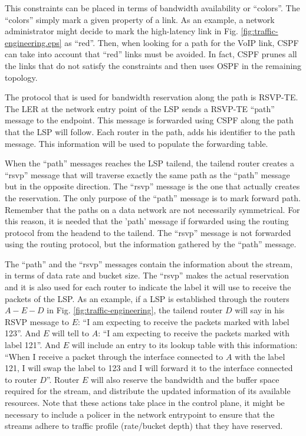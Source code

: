 This constraints can be placed in terms of bandwidth availability or ``colors''.
The ``colors'' simply mark a given property of a link.
As an example, a network administrator might decide to mark the high-latency link in Fig. \ref{fig:traffic-engineering.eps} as ``red''.
Then, when looking for a path for the VoIP link, CSPF can take into account that ``red'' links must be avoided.
In fact, CSPF prunes all the links that do not satisfy the constraints and then uses OSPF in the remaining topology.

The protocol that is used for bandwidth reservation along the path is RSVP-TE.
The LER at the network entry point of the LSP sends a RSVP-TE ``path'' message to the endpoint.
This message is forwarded using CSPF along the path that the LSP will follow. 
Each router in the path, adds his identifier to the path message.
This information will be used to populate the forwarding table.

When the ``path'' messages reaches the LSP tailend, the tailend router creates a ``rsvp'' message that will traverse exactly the same path as the ``path'' message but in the opposite direction.
The ``rsvp'' message is the one that actually creates the reservation.
The only purpose of the ``path'' message is to mark forward path.
Remember that the paths on a data network are not necessarily symmetrical.
For this reason, it is needed that the 'path' message if forwarded using the routing protocol from the headend to the tailend.
The ``rsvp'' message is not forwarded using the routing protocol, but the information gathered by the ``path'' message.

The ``path'' and the ``rsvp'' messages contain the information about the stream, in terms of data rate and bucket size.
The ``rsvp'' makes the actual reservation and it is also used for each router to indicate the label it will use to receive the packets of the LSP.
As an example, if a LSP is established through the routers $A-E-D$ in Fig. \ref{fig:traffic-engineering}, the tailend router $D$ will say in his RSVP message to $E$:
``I am expecting to receive the packets marked with label 123''.
And $E$ will tell to $A$: ``I am expecting to receive the packets marked with label 121''.
And $E$ will include an entry to its lookup table with this information: ``When I receive a packet through the interface connected to $A$ with the label 121, I will swap the label to 123 and I will forward it to the interface connected to router $D$''.
Router $E$ will also reserve the bandwidth and the buffer space required for the stream, and distribute the updated information of its available resources.
Note that these actions take place in the control plane, it might be necessary to include a policer in the network entrypoint to ensure that the streams adhere to traffic profile (rate/bucket depth) that they have reserved.


